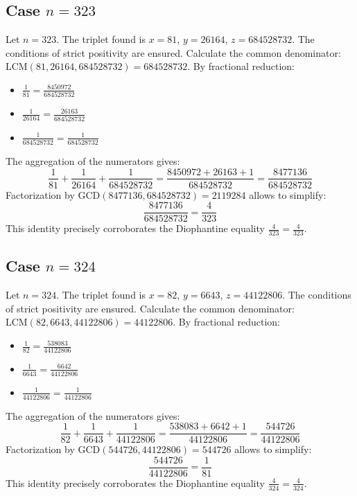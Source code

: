 \documentclass[11pt,a4paper]{article}
\begin{document}
\subsection{Case $n = 323$}
Let $n = 323$. The triplet found is $x = 81$, $y = 26164$, $z = 684528732$.
The conditions of strict positivity are ensured.
Calculate the common denominator: $\text{LCM}(81, 26164, 684528732) = 684528732$.
By fractional reduction:
\begin{itemize}
    \item $\frac{1}{81} = \frac{8450972}{684528732}$
    \item $\frac{1}{26164} = \frac{26163}{684528732}$
    \item $\frac{1}{684528732} = \frac{1}{684528732}$
\end{itemize}
The aggregation of the numerators gives:
$$ \frac{1}{81} + \frac{1}{26164} + \frac{1}{684528732} = \frac{8450972 + 26163 + 1}{684528732} = \frac{8477136}{684528732} $$
Factorization by $\text{GCD}(8477136, 684528732) = 2119284$ allows to simplify:
$$ \frac{8477136}{684528732} = \frac{4}{323} $$
This identity precisely corroborates the Diophantine equality $\frac{4}{323} = \frac{4}{323}$.

\subsection{Case $n = 324$}
Let $n = 324$. The triplet found is $x = 82$, $y = 6643$, $z = 44122806$.
The conditions of strict positivity are ensured.
Calculate the common denominator: $\text{LCM}(82, 6643, 44122806) = 44122806$.
By fractional reduction:
\begin{itemize}
    \item $\frac{1}{82} = \frac{538083}{44122806}$
    \item $\frac{1}{6643} = \frac{6642}{44122806}$
    \item $\frac{1}{44122806} = \frac{1}{44122806}$
\end{itemize}
The aggregation of the numerators gives:
$$ \frac{1}{82} + \frac{1}{6643} + \frac{1}{44122806} = \frac{538083 + 6642 + 1}{44122806} = \frac{544726}{44122806} $$
Factorization by $\text{GCD}(544726, 44122806) = 544726$ allows to simplify:
$$ \frac{544726}{44122806} = \frac{1}{81} $$
This identity precisely corroborates the Diophantine equality $\frac{4}{324} = \frac{4}{324}$.
\end{document}
